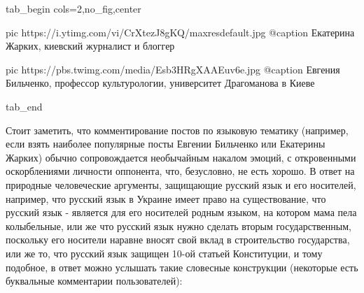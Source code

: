 \ifcmt
  tab_begin cols=2,no_fig,center

     pic https://i.ytimg.com/vi/CrXtezJ8gKQ/maxresdefault.jpg
     @caption Екатерина Жарких, киевский журналист и блоггер

     pic https://pbs.twimg.com/media/Esb3HRgXAAEuv6e.jpg
     @caption Евгения Бильченко, профессор культурологии, университет Драгоманова в Киеве 

  tab_end
\fi

Стоит заметить, что комментирование постов по языковую тематику (например, если
взять наиболее популярные посты Евгении Бильченко или Екатерины Жарких) обычно
сопровождается необычайным накалом эмоций, с откровенными оскорблениями
личности оппонента, что, безусловно, не есть хорошо. В ответ на природные
человеческие аргументы, защищающие русский язык и его носителей, например, что
русский язык в Украине имеет право на существование, что русский язык -
является для его носителей родным языком, на котором мама пела колыбельные, или
же что русский язык нужно сделать вторым государственным, поскольку его 
носители наравне вносят свой вклад в строительство государства, или же то, что
русский язык защищен 10-ой статьей Конституции, и тому подобное, в ответ можно
услышать такие словесные конструкции (некоторые есть буквальные комментарии
пользователей):

